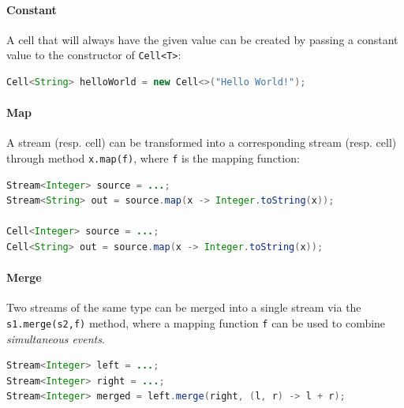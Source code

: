 \paragraph{Constant}
A cell that will always have the given value can be created by passing a constant value to the constructor of \texttt{Cell<T>}:
%
\begin{lstlisting}[frame=single, language=java]
Cell<String> helloWorld = new Cell<>("Hello World!");
\end{lstlisting}


\paragraph{Map}
A stream (resp. cell) can be transformed into a corresponding stream (resp. cell) through method  \texttt{x.map(f)}, where \texttt{f} is the mapping function:
%
\begin{lstlisting}[frame=single, language=java]
Stream<Integer> source = ...;
Stream<String> out = source.map(x -> Integer.toString(x));

Cell<Integer> source = ...;
Cell<String> out = source.map(x -> Integer.toString(x));
\end{lstlisting}  


\paragraph{Merge}
Two streams of the same type can be merged into a single stream via the \texttt{s1.merge(s2,f)} method,
 where a mapping function \texttt{f} can be used to combine \emph{simultaneous events}. 
%
%
\begin{lstlisting}[frame=single, language=java]
Stream<Integer> left = ...;
Stream<Integer> right = ...;
Stream<Integer> merged = left.merge(right, (l, r) -> l + r);
\end{lstlisting}

